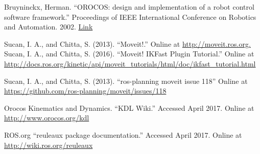 \documentclass[12pt]{report}
\begin{document}
\begin{thebibliography}{99}
 Bruyninckx, Herman. ``OROCOS: design and implementation of a robot control software framework.'' Proceedings of IEEE International Conference on Robotics and Automation. 2002. \href{http://citeseerx.ist.psu.edu/viewdoc/download?doi=10.1.1.415.9503&rep=rep1&type=pdf}{Link}

 Sucan, I. A., and Chitta, S. (2013). ``Moveit!.'' Online at \url{http://moveit.ros.org.}
 Sucan, I. A., and Chitta, S. (2016). ``Moveit! IKFast Plugin Tutorial.'' Online at \url{http://docs.ros.org/kinetic/api/moveit_tutorials/html/doc/ikfast_tutorial.html}

 Sucan, I. A., and Chitta, S. (2013). ``ros-planning moveit issue 118'' Online at \url{https://github.com/ros-planning/moveit/issues/118}

 Orocos Kinematics and Dynamics. ``KDL Wiki.'' Accessed April 2017. Online at \url{http://www.orocos.org/kdl}

 ROS.org ``reuleaux package documentation.'' Accessed April 2017. Online at \url{http://wiki.ros.org/reuleaux}

\end{thebibliography}

% 
% 

%

%
\end{document}
